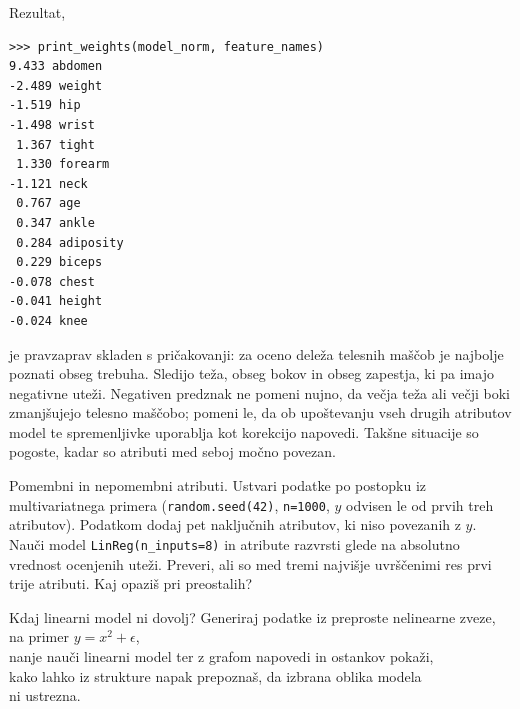 Rezultat,
%
\vspace*{3mm}
\begin{lstlisting}
>>> print_weights(model_norm, feature_names)
9.433 abdomen
-2.489 weight
-1.519 hip
-1.498 wrist
 1.367 tight
 1.330 forearm
-1.121 neck
 0.767 age
 0.347 ankle
 0.284 adiposity
 0.229 biceps
-0.078 chest
-0.041 height
-0.024 knee
\end{lstlisting}
%
je pravzaprav skladen s pričakovanji: za oceno deleža telesnih maščob je najbolje poznati obseg trebuha. Sledijo teža, obseg bokov in obseg zapestja, ki pa imajo negativne uteži. Negativen predznak ne pomeni nujno, da večja teža ali večji boki zmanjšujejo telesno maščobo; pomeni le, da ob upoštevanju vseh drugih atributov model te spremenljivke uporablja kot korekcijo napovedi. Takšne situacije so pogoste, kadar so atributi med seboj močno povezan.

\begin{exercise}{Pomembni in nepomembni atributi.}
Ustvari podatke po postopku iz multivariatnega primera (\texttt{random.seed(42)}, \texttt{n=1000}, $y$ odvisen le od prvih treh atributov). Podatkom dodaj pet naključnih atributov, ki niso povezanih z $y$. Nauči model \texttt{LinReg(n\_inputs=8)} in atribute razvrsti glede na absolutno vrednost ocenjenih uteži. Preveri, ali so med tremi najvišje uvrščenimi res prvi trije atributi. Kaj opaziš pri preostalih?
\end{exercise}

\begin{exercise}{Kdaj linearni model ni dovolj?}
Generiraj podatke iz preproste nelinearne zveze, na primer $y=x^2+\epsilon$,\\
nanje nauči linearni model ter z grafom napovedi in ostankov pokaži,\\
kako lahko iz strukture napak prepoznaš, da izbrana oblika modela\\
ni ustrezna.
\end{exercise}
 